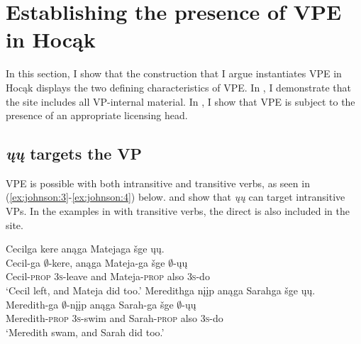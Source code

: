 \documentclass[output=paper]{LSP/langsci}
\begin{document}
\section{Establishing the presence of VPE in Hocąk}\label{sec:johnson:2}

 
In this section, I show that the construction that I argue instantiates VPE in Hocąk displays the two defining characteristics of VPE. In , I demonstrate that the  site includes all VP-internal material. In , I show that VPE is subject to the presence of an appropriate licensing head.
 

\subsection{\emph{ųų} targets the VP}\label{sec:johnson:2.1}

VPE is possible with both intransitive and transitive verbs, as seen in (\ref{ex:johnson:3}-\ref{ex:johnson:4}) below.  and  show that \emph{ųų} can target intransitive VPs. In the examples in  with transitive verbs, the direct  is also included in the  site.
 
\ea\label{ex:johnson:3}
\ea\label{ex:johnson:3a} 
\glll Cecilga {\ob}{\sVP} kere{\cb} anąga Matejaga šge {\ob}ųų{\cb}.\\
Cecil-ga {} $\emptyset$-kere, anąga Mateja-ga šge $\emptyset$-ųų\\
Cecil-\textsc{prop} {} \textsc {3s}-leave and Mateja-\textsc{prop} also \textsc{3s}-do\\
\trans `Cecil left, and Mateja did too.' 
\ex\label{ex:johnson:3b} 
\glll Meredithga {\ob}{\sVP} nįįp{\cb} anąga Sarahga šge {\ob}ųų{\cb}.\\
Meredith-ga {} $\emptyset$-nįįp anąga Sarah-ga šge $\emptyset$-ųų\\
Meredith-\textsc {prop} {} \textsc{3s}-swim and Sarah-\textsc{prop} also \textsc{3s}-do\\
\trans `Meredith swam, and Sarah did too.'
\z
\z
 
\end{document}
